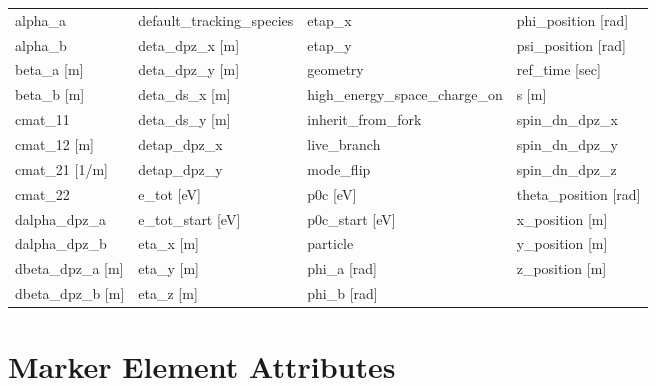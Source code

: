  \begin{tabular}{llll} \toprule
alpha_a                          & default_tracking_species         & etap_x                           & phi_position [rad]               \\
alpha_b                          & deta_dpz_x [m]                   & etap_y                           & psi_position [rad]               \\
beta_a [m]                       & deta_dpz_y [m]                   & geometry                         & ref_time [sec]                   \\
beta_b [m]                       & deta_ds_x [m]                    & high_energy_space_charge_on      & s [m]                            \\
cmat_11                          & deta_ds_y [m]                    & inherit_from_fork                & spin_dn_dpz_x                    \\
cmat_12 [m]                      & detap_dpz_x                      & live_branch                      & spin_dn_dpz_y                    \\
cmat_21 [1/m]                    & detap_dpz_y                      & mode_flip                        & spin_dn_dpz_z                    \\
cmat_22                          & e_tot [eV]                       & p0c [eV]                         & theta_position [rad]             \\
dalpha_dpz_a                     & e_tot_start [eV]                 & p0c_start [eV]                   & x_position [m]                   \\
dalpha_dpz_b                     & eta_x [m]                        & particle                         & y_position [m]                   \\
dbeta_dpz_a [m]                  & eta_y [m]                        & phi_a [rad]                      & z_position [m]                   \\
dbeta_dpz_b [m]                  & eta_z [m]                        & phi_b [rad]                      &                                  \\
 \bottomrule
 \end{tabular}
 \vfill
 
 \section{Marker Element Attributes}
 \label{s:list.marker}
 
